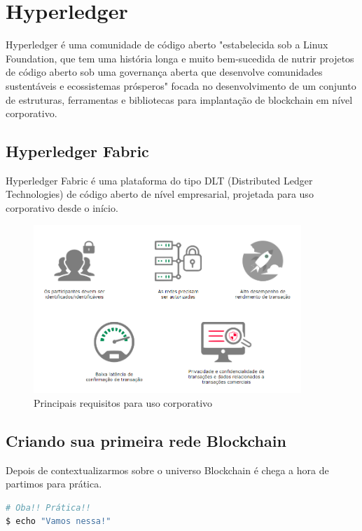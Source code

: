 \documentclass[a4paper,11pt]{article}
\begin{document}
\section{Hyperledger}
Hyperledger\cite{hyperledger} é uma comunidade de código aberto "estabelecida sob a Linux Foundation\cite{linuxfoundation}, que tem uma história longa e muito bem-sucedida de nutrir projetos de código aberto sob uma governança aberta que desenvolve comunidades sustentáveis e ecossistemas prósperos" focada no desenvolvimento de um conjunto de estruturas, ferramentas e bibliotecas para implantação de blockchain em nível corporativo.

\subsection{Hyperledger Fabric}
Hyperledger Fabric\cite{hyperledgerfabric} é uma plataforma do tipo DLT (Distributed Ledger Technologies) de código aberto de nível empresarial, projetada para uso corporativo desde o início.
\begin{figure}[H]
	\centering
	\includegraphics[width=0.9\textwidth]{imagens/requisitos.png}
	\caption{Principais requisitos para uso corporativo}
\end{figure}

\subsection{Criando sua primeira rede Blockchain}
Depois de contextualizarmos sobre o universo Blockchain é chega a hora de partimos para prática.

\begin{lstlisting}[language=bash]
# Oba!! Prática!! 
$ echo "Vamos nessa!"
\end{lstlisting}
\end{document}
